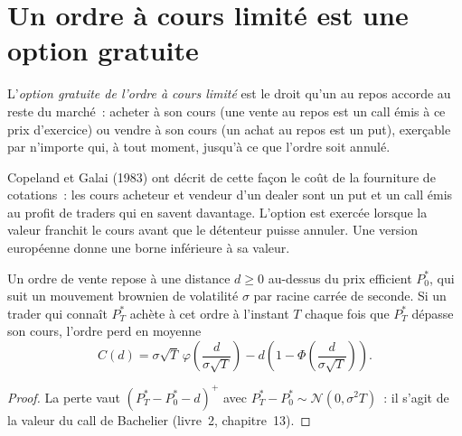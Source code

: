 \section{Un ordre à cours limité est une option gratuite}

\begin{definition}\label{def:mx:order-types-and-their-uses:option}
L'\emph{option gratuite de l'ordre à cours limité} est le droit qu'un  au repos accorde au reste du marché~: acheter à son
cours (une vente au repos est un call émis à ce prix d'exercice) ou vendre à son cours (un achat au repos est un put), exerçable par n'importe qui, à tout moment, jusqu'à ce
que l'ordre soit annulé.
\end{definition}

Copeland et Galai (1983) ont décrit de cette façon le coût de la fourniture de cotations~: les cours acheteur et vendeur d'un dealer sont un put et un call émis au profit de traders qui en savent davantage.
L'option est exercée lorsque la valeur franchit le cours avant que le détenteur puisse annuler. Une version européenne donne une borne inférieure à sa valeur.

\begin{proposition}\label{prop:mx:order-types-and-their-uses:option}
Un ordre de vente repose à une distance $d\ge0$ au-dessus du prix efficient $P^\ast_0$, qui suit un mouvement brownien de volatilité $\sigma$ par racine carrée
de seconde. Si un trader qui connaît $P^\ast_T$ achète à cet ordre à l'instant $T$ chaque fois que $P^\ast_T$ dépasse son cours, l'ordre perd en moyenne
\[
C(d)=\sigma\sqrt T\,\varphi\!\left(\frac{d}{\sigma\sqrt T}\right)-d\left(1-\Phi\!\left(\frac{d}{\sigma\sqrt T}\right)\right).
\]
\end{proposition}

\begin{proof}
La perte vaut $(P^\ast_T-P^\ast_0-d)^+$ avec $P^\ast_T-P^\ast_0\sim\mathcal N(0,\sigma^2T)$~: il s'agit de la valeur du call de Bachelier (livre~2, chapitre~13).
\end{proof}

\label{lst:mx:order-types-and-their-uses:option}

